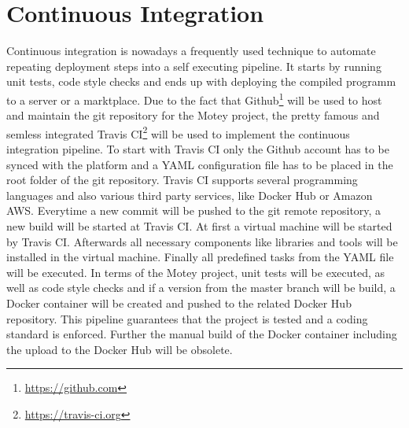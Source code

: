 \section{Continuous Integration}
Continuous integration is nowadays a frequently used technique to automate repeating deployment steps into a self executing pipeline.
It starts by running unit tests, code style checks and ends up with deploying the compiled programm to a server or a marktplace.
Due to the fact that Github\footnote{\url{https://github.com}} will be used to host and maintain the git repository for the Motey project, the pretty famous and semless integrated Travis CI\footnote{\url{https://travis-ci.org}} will be used to implement the continuous integration pipeline.
To start with Travis CI only the Github account has to be synced with the platform and a \ac{YAML} configuration file has to be placed in the root folder of the git repository.
Travis CI supports several programming languages and also various third party services, like Docker Hub or Amazon AWS.
Everytime a new commit will be pushed to the git remote repository, a new build will be started at Travis CI.
At first a virtual machine will be started by Travis CI.
Afterwards all necessary components like libraries and tools will be installed in the virtual machine.
Finally all predefined tasks from the \ac{YAML} file will be executed.
In terms of the Motey project, unit tests will be executed, as well as code style checks and if a version from the master branch will be build, a Docker container will be created and pushed to the related Docker Hub repository.
This pipeline guarantees that the project is tested and a coding standard is enforced.
Further the manual build of the Docker container including the upload to the Docker Hub will be obsolete.
